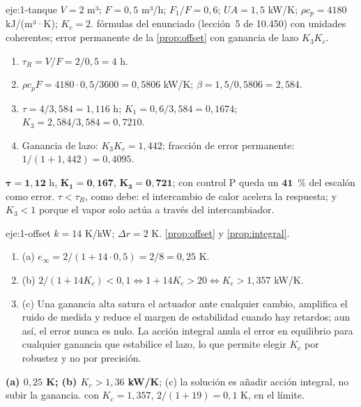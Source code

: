\begin{solucion}{eje:1-tanque}
\datos $V=2$ m³; $F=0{,}5$ m³/h; $F_1/F=0{,}6$; $UA=1{,}5$ kW/K; $\rho c_p=4180$ kJ/(m³·K); $K_c=2$.
\planteamiento fórmulas del enunciado (lección~5 de 10.450) con unidades coherentes; error permanente de la \cref{prop:offset} con ganancia de lazo $K_3K_c$.
\pasos
\begin{enumerate}[label=\arabic*.]
  \item $\tau_R=V/F=2/0{,}5=4$ h.
  \item $\rho c_pF=4180\cdot0{,}5/3600=0{,}5806$ kW/K; $\beta=1{,}5/0{,}5806=2{,}584$.
  \item $\tau=4/3{,}584=1{,}116$ h; $K_1=0{,}6/3{,}584=0{,}1674$; $K_3=2{,}584/3{,}584=0{,}7210$.
  \item Ganancia de lazo: $K_3K_c=1{,}442$; fracción de error permanente: $1/(1+1{,}442)=0{,}4095$.
\end{enumerate}
\resultado $\mathbf{\tau=1{,}12}$ h, $\mathbf{K_1=0{,}167}$, $\mathbf{K_3=0{,}721}$; con control P queda un $\mathbf{41}$~\% del escalón como error.
\comprobacion $\tau<\tau_R$, como debe: el intercambio de calor acelera la respuesta; y $K_3<1$ porque el vapor solo actúa a través del intercambiador.
\end{solucion}

\begin{solucion}{eje:1-offset}
\datos $k=14$ K/kW; $\Delta r=2$ K.
\planteamiento \cref{prop:offset} y \cref{prop:integral}.
\pasos
\begin{enumerate}[label=\arabic*.]
  \item (a) $e_\infty=2/(1+14\cdot0{,}5)=2/8=0{,}25$ K.
  \item (b) $2/(1+14K_c)<0{,}1\iff1+14K_c>20\iff K_c>1{,}357$ kW/K.
  \item (c) Una ganancia alta satura el actuador ante cualquier cambio, amplifica el ruido de medida y reduce el margen de estabilidad cuando hay retardos; aun así, el error nunca es nulo. La acción integral anula el error en equilibrio para cualquier ganancia que estabilice el lazo, lo que permite elegir $K_c$ por robustez y no por precisión.
\end{enumerate}
\resultado \textbf{(a) $0{,}25$ K; (b) $K_c>1{,}36$ kW/K}; (c) la solución es añadir acción integral, no subir la ganancia.
\comprobacion con $K_c=1{,}357$, $2/(1+19)=0{,}1$ K, en el límite.
\end{solucion}

